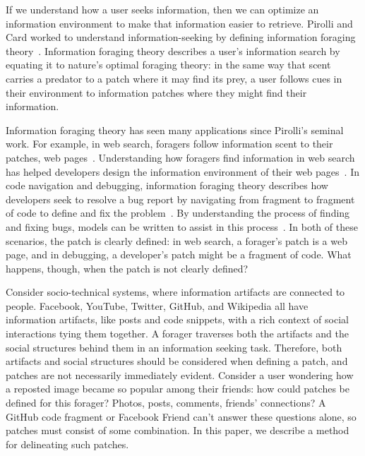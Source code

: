 If we understand how a user seeks information, then we can optimize an information environment to make that information easier to retrieve. Pirolli and Card worked to understand information-seeking by defining information foraging theory~\cite{ift}.
Information foraging theory describes a user's information search by equating it to nature's optimal foraging theory: in the same way that scent carries a predator to a patch where it may find its prey, a user follows cues in their environment to information patches where they might find their information.

Information foraging theory has seen many applications since Pirolli's seminal work. For example, in web search, foragers follow information scent to their patches, web pages~\cite{pirolliWeb,wufis}. Understanding how foragers find information in web search has helped developers design the information environment of their web pages~\cite{wufis}. In code navigation and debugging, information foraging theory describes how developers seek to resolve a bug report by navigating from fragment to fragment of code to define and fix the problem~\cite{navValueCost}.
By understanding the process of finding and fixing bugs, models can be written to assist in this process~\cite{pfisRevisit}. In both of these scenarios, the patch is clearly defined: in web search, a forager's patch is a web page, and in debugging, a developer's patch might be a fragment of code. What happens, though, when the patch is not clearly defined?

Consider socio-technical systems, where information artifacts are connected to people. Facebook, YouTube, Twitter, GitHub, and Wikipedia all have information artifacts, like posts and code snippets, with a rich context of social interactions tying them together. A forager traverses both the artifacts and the social structures behind them in an information seeking task. Therefore, both artifacts and social structures should be considered when defining a patch, and patches are not necessarily immediately evident. Consider a user wondering how a reposted image became so popular among their friends: how could patches be defined for this forager? Photos, posts, comments, friends' connections? A GitHub code fragment or Facebook Friend can't answer these questions alone, so patches must consist of some combination. In this paper, we describe a method for delineating such patches.

